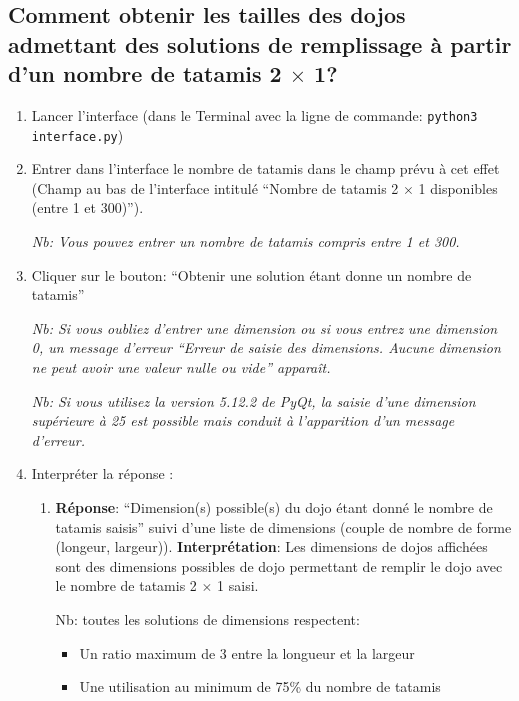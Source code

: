\subsection{Comment obtenir les tailles des dojos admettant des solutions de remplissage à partir d’un nombre de tatamis 2 $\times$ 1?}

\begin{enumerate}
    \item Lancer l’interface (dans le Terminal avec la ligne de commande: \texttt{python3 interface.py})
    \item Entrer dans l’interface le nombre de tatamis dans le champ prévu à cet effet (Champ au bas de l’interface intitulé
          “Nombre de tatamis 2 $\times$ 1 disponibles (entre 1 et 300)”).

          \emph{Nb: Vous pouvez entrer un nombre de tatamis compris entre 1 et 300.}

    \item Cliquer sur le bouton: “Obtenir une solution étant donne un nombre de tatamis”

          \emph{Nb: Si vous oubliez d’entrer une dimension ou si vous entrez une dimension 0,
              un message d’erreur “Erreur de saisie des dimensions.
              Aucune dimension ne peut avoir une valeur nulle ou vide” apparaît.}

          \emph{Nb: Si vous utilisez la version 5.12.2 de PyQt, la saisie d'une dimension supérieure à 25 est possible mais
              conduit à l'apparition d’un message d’erreur.}

    \item Interpréter la réponse :
          \begin{enumerate}
              \item \textbf{Réponse}: “Dimension(s) possible(s) du dojo étant donné le nombre de tatamis saisis” suivi
                    d’une liste de dimensions (couple de nombre de forme (longeur, largeur)).
                    \textbf{Interprétation}: Les dimensions de dojos affichées sont des dimensions possibles de dojo permettant
                    de remplir le dojo avec le nombre de tatamis 2 $\times$ 1 saisi.

                    Nb: toutes les solutions de dimensions respectent:
                    \begin{itemize}
                        \item Un ratio maximum de 3 entre la longueur et la largeur
                        \item Une utilisation au minimum de 75\% du nombre de tatamis
                    \end{itemize}


\end{enumerate}
\end{enumerate}

